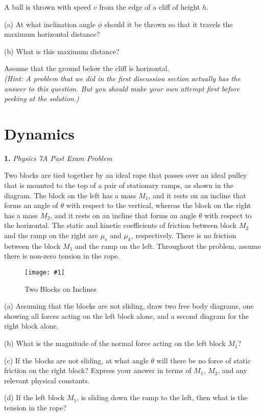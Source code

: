 \documentclass[11pt]{article}
\newcommand{\fig}[4]{
    \begin{figure}[H]
        \centering
        \texttt{[image: \#1]}
        \caption{#2}
        \label{exp4fit}
    \end{figure}
}
\theoremstyle{gangnamstyle}{\newtheorem{definition}{Definition}[]}
\theoremstyle{gangnamstyle}{\newtheorem{example}{Example}[]}
\theoremstyle{gangnamstyle}{\newtheorem{problem}{Problem}[]}
\begin{document}
A ball is thrown with speed $v$ from the edge of a cliff of height $h$. 

(a) At what inclination angle $\phi$ should it be thrown so that it travels the maximum horizontal distance? 

(b) What is this maximum distance? 

Assume that the ground below the cliff is horizontal. \\
\textit{(Hint: A problem that we did in the first discussion section actually has the answer to this question. But you should make your own attempt first before peeking at the solution.)}

\pagebreak

\section{Dynamics}

\textbf{1.} \textit{Physics 7A Past Exam Problem}

Two blocks are tied together by an ideal rope that passes over an ideal pulley that is mounted to the top of a pair of stationary ramps, as shown in the diagram. The block on the left has a mass $M_1$, and it rests on an incline that forms an angle of $\theta$ with respect to the vertical, whereas the block on the right has a mass $M_2$, and it rests on an incline that forms an angle $\theta$ with respect to the horizontal. The static and kinetic coefficients of friction between block $M_2$ and the ramp on the right are $\mu_s$ and $\mu_k$, respectively. There is no friction between the block $M_1$ and the ramp on the left. Throughout the problem, assume there is non-zero tension in the rope.

\fig{figs/mt1/s192.png}{Two Blocks on Inclines}{0.65}{0}

(a) Assuming that the blocks are not sliding, draw two free body diagrams, one showing all forces acting on the left block alone, and a second diagram for the right block alone.

(b) What is the magnitude of the normal force acting on the left block $M_1$?

(c) If the blocks are not sliding, at what angle $\theta$ will there be no force of static friction on the right block? Express your answer in terms of $M_1$, $M_2$, and any relevant physical constants.

(d) If the left block $M_1$, is sliding down the ramp to the left, then what is the tension in the rope?
\end{document}
